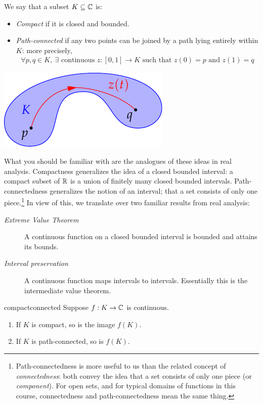 \begin{defn}[lower separated=false, sidebyside, sidebyside align=top seam, sidebyside gap=0pt, righthand width=0.35\linewidth]{}{}
We say that a subset $K\subseteq\mathbb{C}$ is:
\begin{itemize}
  \item \emph{Compact} if it is closed and bounded.
  \item \emph{Path-connected} if any two points can be joined by a path lying entirely within $K$: more precisely,
  \begin{gather*}
  \forall p,q\in K,\ \exists \text{ continuous }z:[0,1]\to K\text{ such that }
  z(0)=p \text{ and }z(1)=q
  \end{gather*}
\end{itemize} 
\tcblower
\flushright\includegraphics{limits-topology}
\end{defn}
\goodbreak

What you should be familiar with are the analogues of these ideas in real analysis.
Compactness generalizes the idea of a closed bounded interval: a compact subset of $\mathbb{R}$ is a union of finitely many closed bounded intervals. Path-connectedness generalizes the notion of an interval; that a set consists of only one piece.\footnote{Path-connectedness is more useful to us than the related concept of \emph{connectedness}: both convey the idea that a set consists of only one piece (or \emph{component}). For open sets, and for typical domains of functions in this course, connectedness and path-connectedness mean the same thing.} In view of this, we translate over two familiar results from real analysis:
\begin{description}
\item[\normalfont\emph{Extreme Value Theorem}] A continuous function on a closed bounded interval is bounded and attains its bounds.
\item[\normalfont\emph{Interval preservation}] A continuous function maps intervals to intervals. Essentially this is the intermediate value theorem.
\end{description}

\begin{thm}{}{compactconnected}
Suppose $f:K\to\mathbb{C}$ is continuous.
\begin{enumerate}
  \item If $K$ is compact, so is the image $f(K)$.
  \item If $K$ is path-connected, so is $f(K)$.
\end{enumerate}
\end{thm}

